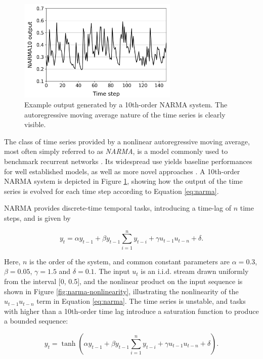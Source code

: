 \begin{figure}[t!]
  \centering
  \includegraphics[width=3.0in]{figures/NARMA10.png}
  \caption{
    Example output generated by a 10th-order NARMA system. The autoregressive
moving average nature of the time series is clearly visible.
  }
  \label{fig:narma10}
\end{figure}

The class of time series provided by a nonlinear autoregressive moving average,
most often simply referred to as \textit{NARMA}, is a model commonly used to
benchmark recurrent networks \cite{atiya_new_2000}. Its widespread use yields
baseline performances for well established models, as well as more novel
approaches \cite{verstraeten_experimental_2007, appeltant_information_2011}. A
10th-order NARMA system is depicted in Figure \ref{fig:narma10}, showing how the
output of the time series is evolved for each time step according to Equation
\ref{eq:narma}.

NARMA provides discrete-time temporal tasks, introducing a time-lag of $n$ time
steps, and is given by

\begin{equation}
  y_{t} = \alpha y_{t-1} +
  \beta y_{t-1} \sum_{i=1}^{n}y_{t-i} +
  \gamma u_{t-1}u_{t-n} +
  \delta
  .
  \label{eq:narma}
\end{equation}

Here, $n$ is the order of the system, and common constant parameters are $\alpha
= 0.3$, $\beta = 0.05$, $\gamma = 1.5$ and $\delta = 0.1$. The input $u_{t}$ is
an i.i.d. stream drawn uniformly from the interval [0, 0.5], and the nonlinear
product on the input sequence is shown in Figure \ref{fig:narma-nonlinearity},
illustrating the nonlinearity of the $u_{t-1}u_{t-n}$ term in Equation
\ref{eq:narma}. The time series is unstable, and tasks with higher than a
10th-order time lag introduce a saturation function to produce a bounded
sequence:

\begin{equation}
  y_{t} =
  \tanh(
  \alpha y_{t-1} +
  \beta y_{t-1} \sum_{i=1}^{n}y_{t-i} +
  \gamma u_{t-1}u_{t-n} +
  \delta
  )
  .
  \label{eq:narma-tanh}
\end{equation}


